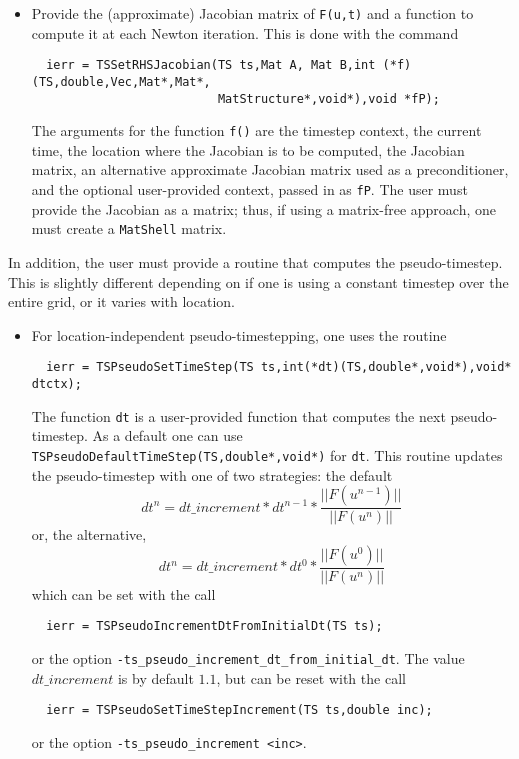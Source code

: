 {\begin{itemize}
\item Provide the (approximate) Jacobian matrix of {\tt F(u,t)} and a 
function to compute it at each Newton iteration. This is done with the command
\begin{verbatim}
  ierr = TSSetRHSJacobian(TS ts,Mat A, Mat B,int (*f)(TS,double,Vec,Mat*,Mat*,
                          MatStructure*,void*),void *fP);
\end{verbatim}
The  arguments for the function {\tt f()} are
the timestep context, the current time, the location where the
Jacobian is to be computed, the Jacobian matrix, an alternative
approximate Jacobian matrix used as a preconditioner, and the optional
user-provided context, passed in as {\tt fP}. The user must provide the 
Jacobian as a matrix; thus, if using a matrix-free approach, one 
must create a {\tt MatShell} matrix.
\end{itemize}

In addition, the user must provide a routine that computes the 
pseudo-timestep. This is slightly different depending on if 
one is using a constant timestep over the entire grid, or it varies
with location. 
\begin{itemize}
\item For location-independent pseudo-timestepping, one uses the routine 
\begin{verbatim}
  ierr = TSPseudoSetTimeStep(TS ts,int(*dt)(TS,double*,void*),void* dtctx);
\end{verbatim}
The function {\tt dt} is a user-provided function that computes the next 
pseudo-timestep. As a default one can use
{\tt TSPseudoDefaultTimeStep(TS,double*,void*)} for {\tt dt}. This routine
updates the pseudo-timestep with one of two strategies: the default
\[
   dt^{n} = dt\_increment*dt^{n-1}*\frac{|| F(u^{n-1}) ||}{|| F(u^{n})||}
\]
or, the alternative, 
\[
   dt^{n} = dt\_increment*dt^{0}*\frac{|| F(u^{0}) ||}{|| F(u^{n})||}
\]
which can be set with the call
\begin{verbatim}
  ierr = TSPseudoIncrementDtFromInitialDt(TS ts);
\end{verbatim}
or  
the option {\tt -ts\_pseudo\_increment\_dt\_from\_initial\_dt}. 
The value $ dt\_increment $ is by default $ 1.1$, but can be reset with the 
call 
\begin{verbatim}
  ierr = TSPseudoSetTimeStepIncrement(TS ts,double inc); 
\end{verbatim}
or  the option 
{\tt  -ts\_pseudo\_increment <inc>}. 



\end{itemize}}
